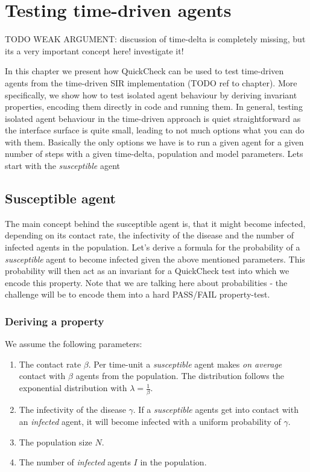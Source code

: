 \chapter{Testing time-driven agents}

TODO WEAK ARGUMENT: discussion of time-delta is completely missing, but its a very important concept here! investigate it!

In this chapter we present how QuickCheck can be used to test time-driven agents from the time-driven SIR implementation (TODO ref to chapter). More specifically, we show how to test isolated agent behaviour by deriving invariant properties, encoding them directly in code and running them. 
In general, testing isolated agent behaviour in the time-driven approach is quiet straightforward as the interface surface is quite small, leading to not much options what you can do with them. Basically the only options we have is to run a given agent for a given number of steps with a given time-delta, population and model parameters. Lets start with the \textit{susceptible} agent

\section{Susceptible agent}
The main concept behind the susceptible agent is, that it might become infected, depending on its contact rate, the infectivity of the disease and the number of infected agents in the population. Let's derive a formula for the probability of a \textit{susceptible} agent to become infected given the above mentioned parameters. This probability will then act as an invariant for a QuickCheck test into which we encode this property. Note that we are talking here about probabilities - the challenge will be to encode them into a hard PASS/FAIL property-test.

\subsection{Deriving a property}
We assume the following parameters:

\begin{enumerate}
	\item The contact rate $\beta$. Per time-unit a \textit{susceptible} agent makes \textit{on average} contact with $\beta$ agents from the population. The distribution follows the exponential distribution with $\lambda = \frac{1}{\beta}$.
	\item The infectivity of the disease $\gamma$. If a \textit{susceptible} agents get into contact with an \textit{infected} agent, it will become infected with a uniform probability of $\gamma$. 
	\item The population size $N$.
	\item The number of \textit{infected} agents $I$ in the population.
\end{enumerate}


